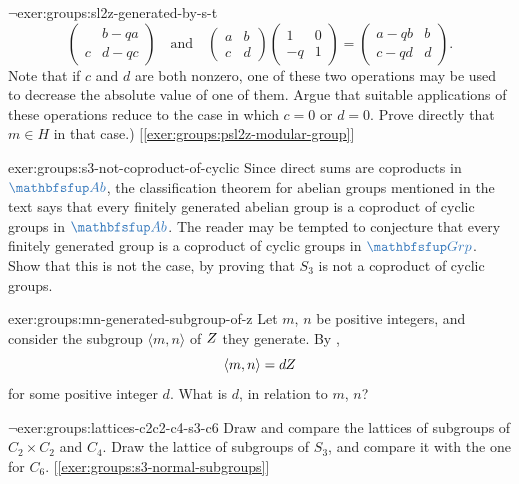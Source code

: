 \begin{exer}{$\lnot$}{exer:groups:sl2z-generated-by-s-t}
\[\begin{pmatrix}
      & b-qa \\ c & d-qc \end{pmatrix} \quad \text{and} \quad
    \begin{pmatrix} a & b \\ c & d \end{pmatrix}
    \begin{pmatrix} 1 & 0 \\ -q & 1 \end{pmatrix} = \begin{pmatrix}
      a-qb & b \\ c-qd & d \end{pmatrix}.
  \]
  Note that if $c$ and $d$ are both nonzero, one of these two
  operations may be used to decrease the absolute value of one of
  them. Argue that suitable applications of these operations reduce to
  the case in which $c=0$ or $d=0$. Prove directly that $m \in H$ in
  that case.) [\ref{exer:groups:psl2z-modular-group}]
\end{exer}
\begin{exer}{}{exer:groups:s3-not-coproduct-of-cyclic}
  Since direct sums are coproducts in $\categ{Ab}$, the classification
  theorem for abelian groups mentioned in the text says that every
  finitely generated abelian group is a coproduct of cyclic groups in
  $\categ{Ab}$. The reader may be tempted to conjecture that every
  finitely generated group is a coproduct of cyclic groups in
  $\categ{Grp}$. Show that
  this is not the case, by proving that $S_3$ is not a coproduct of
  cyclic groups.
\end{exer}
\begin{exer}{}{exer:groups:mn-generated-subgroup-of-z}
  Let $m$, $n$ be positive integers, and consider the subgroup
  $\langle m,n \rangle$ of $Z$ they generate. By
  ,
  \[
    \langle m,n \rangle = dZ
  \]
  for some positive integer $d$. What is $d$, in relation to $m$, $n$?
\end{exer}
\begin{exer}{$\lnot$}{exer:groups:lattices-c2c2-c4-s3-c6}
  Draw and compare the lattices of subgroups of $C_2 \times C_2$ and
  $C_4$. Draw the lattice of subgroups of $S_3$, and compare it with
  the one for $C_6$. [\ref{exer:groups:s3-normal-subgroups}]
\end{exer}
